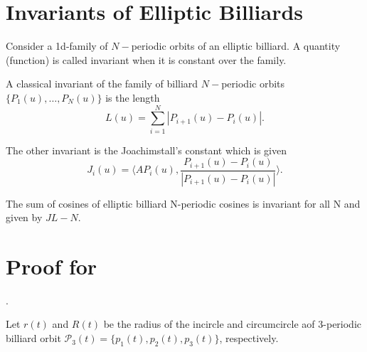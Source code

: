 \section{Invariants of Elliptic Billiards}

\begin{definition}
\label{def:invariant}
Consider a 1d-family of $N-$periodic orbits of an elliptic billiard.  A quantity (function) is called invariant when it is constant over the family. 
\end{definition}

A classical invariant of the family of  billiard $N-$periodic orbits $\{P_1(u),\ldots, P_N(u)\}$ is the length 
\[ L(u)=\sum_{i=1}^N |P_{i+1}(u)-P_i(u)|.\]

The other invariant  is the Joachimstall's constant which is given
\[J_i(u)= \big\langle A P_i(u),\frac{P_{i+1}(u)-P_{i }(u)}{ |P_{i+1}(u)-P_{i }(u)|}\big\rangle.\]

\begin{theorem}\label{thm:soma_cossenos_N}
The sum of cosines of elliptic billiard N-periodic cosines is invariant for all N and given by $J L - N$.
\end{theorem}

\section{Proof for }

\cite{reznik2020-intelligencer,garcia2020-new-properties}.

Let $r(t)$ and $R(t)$ be the radius of the incircle and circumcircle aof 3-periodic billiard orbit $\mathcal{P}_3(t)=\{p_1(t),p_2(t),p_3(t)\}$, respectively.

